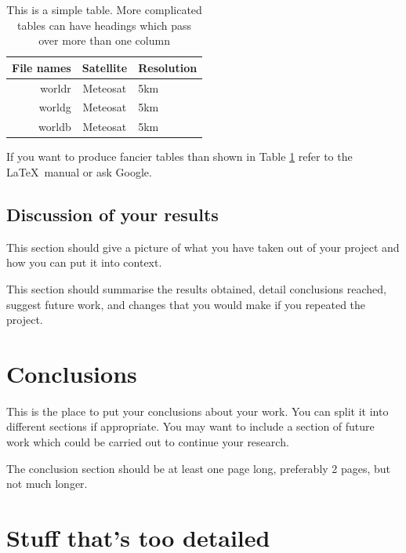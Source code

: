\documentclass[12pt,a4paper]{report}
\begin{document}
\begin{table}[h]
\begin{center}
\begin{tabular}{||r|c|l||}
\hline
\textbf{File names} & \textbf{Satellite} & \textbf{Resolution}\\
\hline
  worldr            &  Meteosat          &   5km\\
  worldg            &  Meteosat          &   5km\\
  worldb            &  Meteosat          &   5km\\
\hline
\end{tabular}
\end{center}
\caption{This is a simple table. More complicated tables can have
headings which pass over more than one column}
\label{simple_table}
\end{table}

If you want to produce fancier tables than shown in Table \ref{simple_table}
refer to the \LaTeX\ manual or ask Google.

\section{Discussion of your results}

This section should give a picture of what you have taken out of your
project and how you can put it into context.

This section should summarise the results obtained, detail conclusions
reached, suggest future work, and changes that you would make if you
repeated the project.

\chapter{Conclusions}

This is the place to put your conclusions about your work. You can
split it into different sections if appropriate. You may want to include
a section of future work which could be carried out to continue your
research.

The conclusion section should be at least one page long, preferably 2
pages, but not much longer.

\appendix

\chapter{Stuff that's too detailed}
\end{document}
